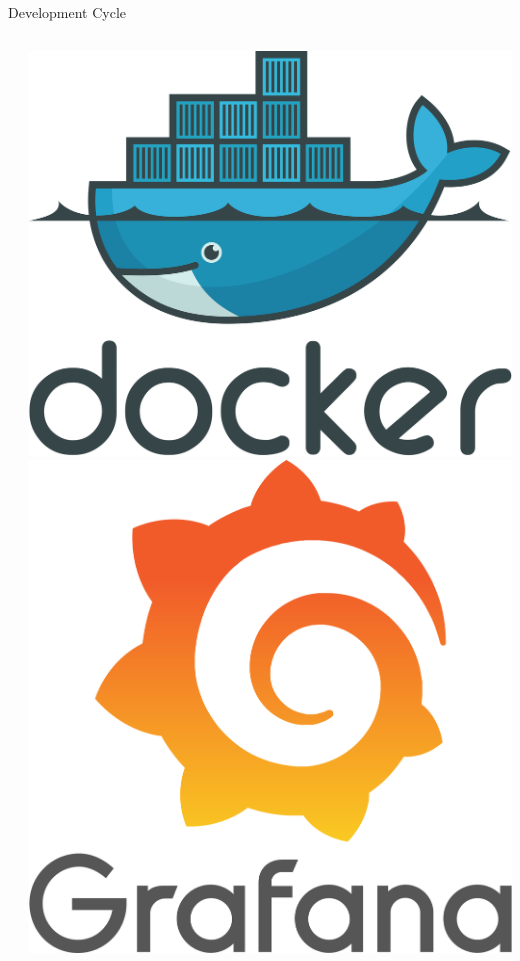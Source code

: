 \documentclass{beamer}
\begin{document}
\begin{frame}{Development Cycle}
\begin{columns}
\begin{column}{0.25\textwidth}
\begin{center}
        \end{center}
    \end{column}
    \begin{column}{0.25\textwidth}
        \begin{center}
        \includegraphics[width=0.7\columnwidth]{figures/docker_icon.png} \\
        \vspace{1.5cm}
        \includegraphics[width=0.6\columnwidth]{figures/grafana_icon.png}
        \end{center}
    \end{column}
\end{columns}
\end{frame}
\end{document}
